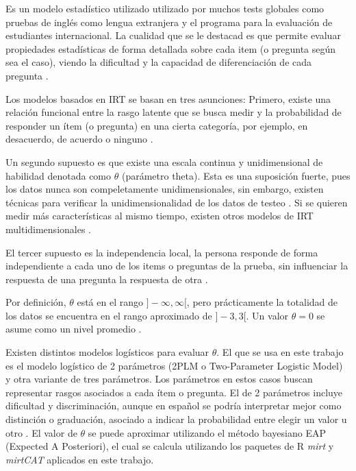 Es un modelo estadístico utilizado utilizado por muchos tests globales como pruebas de inglés como lengua extranjera y el programa para la evaluación de estudiantes internacional. La cualidad que se le destacad es que permite evaluar propiedades estadísticas de forma detallada sobre cada item (o pregunta según sea el caso), viendo la dificultad y la capacidad de diferenciación de cada pregunta \cite{Linden2015HandbookOI, IRTShojima2022}.

Los modelos basados en IRT se basan en tres asunciones: Primero, existe una relación funcional entre la rasgo latente que se busca medir y la probabilidad de responder un ítem (o pregunta) en una cierta categoría, por ejemplo, en desacuerdo, de acuerdo o ninguno \cite{CalderonStatisticalIRT}.

Un segundo supuesto es que existe una escala continua y unidimensional de habilidad denotada como $\theta$ (parámetro theta). Esta es una suposición fuerte, pues los datos nunca son compeletamente unidimensionales, sin embargo, existen técnicas para verificar la unidimensionalidad de los datos de testeo \cite{IRTShojima2022}. Si se quieren medir más características al mismo tiempo, existen otros modelos de IRT multidimensionales \cite{Reckase2009MultidimensionalIRT}.

El tercer supuesto es la independencia local, la persona responde de forma independiente a cada uno de los items o preguntas de la prueba, sin influenciar la respuesta de una pregunta la respuesta de otra \cite{CalderonStatisticalIRT}.

Por definición, $\theta$ está en el rango $]-\infty, \infty [$, pero prácticamente la totalidad de los datos se encuentra en el rango aproximado de $]-3, 3[$. Un valor $\theta = 0$ se asume como un nivel promedio \cite{IRTShojima2022}. 

Existen distintos modelos logísticos para evaluar $\theta$. El que se usa en este trabajo es el modelo logístico de 2 parámetros (2PLM o Two-Parameter Logistic Model) y otra variante de tres parámetros. Los parámetros en estos casos buscan representar rasgos asociados a cada ítem o pregunta. El de 2 parámetros incluye dificultad y discriminación, aunque en español se podría interpretar mejor como distinción o graduación, asociado a indicar la probabilidad entre elegir un valor u otro \cite{CalderonStatisticalIRT}.  El valor de $\theta$ se puede aproximar utilizando el método bayesiano EAP (Expected A Posteriori), el cual se calcula utilizando los paquetes de R \textit{mirt} \cite{RMIRT} y \textit{mirtCAT} \cite{RPackageMIRTCAT} aplicados en este trabajo. 

